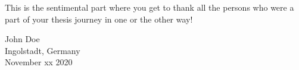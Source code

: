 
This is the sentimental part where you get to thank all the persons who were a part of your 
thesis journey in one or the other way!
		
John Doe\\
Ingolstadt, Germany\\
November xx 2020